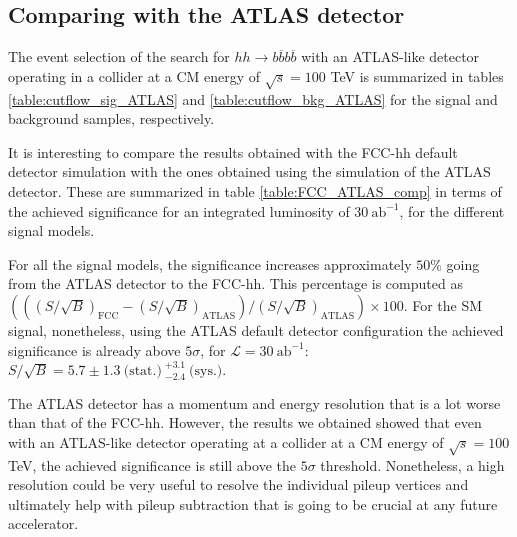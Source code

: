 
\subsection{Comparing with the ATLAS detector}

The event selection of the search for $hh\rightarrow b\overline{b}b\overline{b}$ with an ATLAS-like detector operating in a collider at a CM energy of $\sqrt{s}=100$ TeV is summarized in tables \ref{table:cutflow_sig_ATLAS} and \ref{table:cutflow_bkg_ATLAS} for the signal and background samples, respectively.

It is interesting to compare the results obtained with the FCC-hh default detector simulation with the ones obtained using the simulation of the ATLAS detector. These are summarized in table \ref{table:FCC_ATLAS_comp} in terms of the achieved significance for an integrated luminosity of $30~\text{ab}^{-1}$, for the different signal models.

For all the signal models, the significance increases approximately $50\%$ going from the ATLAS detector to the FCC-hh. This percentage is computed as $\left(\left((S/\sqrt{B})_{\text{FCC}}-(S/\sqrt{B})_{\text{ATLAS}}\right)/(S/\sqrt{B})_{\text{ATLAS}}\right)\times 100$. For the SM signal, nonetheless, using the ATLAS default detector configuration the achieved significance is already above $5\sigma$, for $\mathcal{L}=30~\text{ab}^{-1}$: $S/\sqrt{B}=5.7\pm 1.3 ~\text{(stat.)}~^{+3.1}_{-2.4}~\text{(sys.)}$. 

The ATLAS detector has a momentum and energy resolution that is a lot worse than that of the FCC-hh. However, the results we obtained showed that even with an ATLAS-like detector operating at a collider at a CM energy of $\sqrt{s}=100$ TeV, the achieved significance is still above the $5\sigma$ threshold. Nonetheless, a high resolution could be very useful to resolve the individual pileup vertices and ultimately help with pileup subtraction that is going to be crucial at any future accelerator.


